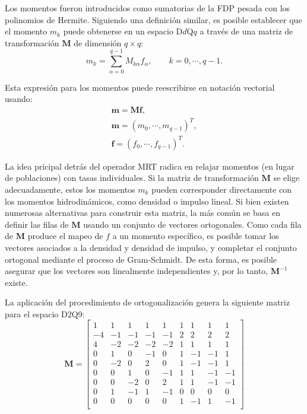 Los momentos fueron introducidos como sumatorias de la FDP pesada con los polinomios de Hermite. Siguiendo una definici\'on similar, es posible establecer que el momento $m_k$ puede obtenerse en un espacio D$d$Q$q$ a trav\'es de una matriz de transformaci\'on $\bm{M}$ de dimensi\'on $q \times q$:
\begin{equation}
	m_k = \sum_{\alpha=0}^{q-1}M_{k\alpha}f_{\alpha}, \qquad  k=0,\cdots, q-1.
\end{equation}

Esta expresi\'on para los momentos puede reescribirse en notaci\'on vectorial usando:
\begin{equation}
	\begin{gathered}
		\bm{m}=\bm{Mf}, \\
		\bm{m} = (m_0, \cdots, m_{q-1})^T, \\
		\bm{f} = (f_0, \cdots, f_{q-1})^T.
	\end{gathered}
\end{equation}

La idea pricipal detr\'as del operador MRT radica en relajar momentos (en lugar de poblaciones) con tasas individuales. Si la matriz de transformaci\'on $\bm{M}$ se elige adecuadamente, estos los momentos $m_k$ pueden corresponder directamente con los momentos hidrodin\'amicos, como densidad o impulso lineal. Si bien existen numerosas alternativas para construir esta matriz, la m\'as com\'un se basa en definir las filas de $\bm{M}$ usando un conjunto de vectores ortogonales. Como cada fila de $\bm{M}$ produce el mapeo de $f$ a un momento espec\'ifico, es posible tomar los vectores asociados a la densidad y densidad de impulso, y completar el conjunto ortogonal mediante el proceso de Gram-Schmidt. De esta forma, es posible asegurar que los vectores son linealmente independientes y, por lo tanto, $\bm{M}^{-1}$ existe.

La aplicaci\'on del procedimiento de ortogonalizaci\'on genera la siguiente matriz para el espacio D2Q9:
\begin{equation}
	\bm{M}=
	\begin{bmatrix}
	 1 &  1 &  1 &  1 &  1 & 1 &  1 &  1 &  1 \\
	-4 & -1 & -1 & -1 & -1 & 2 &  2 &  2 &  2 \\
	 4 & -2 & -2 & -2 & -2 & 1 &  1 &  1 &  1 \\
	 0 &  1 &  0 & -1 &  0 & 1 & -1 & -1 &  1 \\
	 0 & -2 &  0 &  2 &  0 & 1 & -1 & -1 &  1 \\
	 0 &  0 &  1 &  0 & -1 & 1 &  1 & -1 & -1 \\
	 0 &  0 & -2 &  0 &  2 & 1 &  1 & -1 & -1 \\
	 0 &  1 & -1 &  1 & -1 & 0 &  0 &  0 &  0 \\
	 0 &  0 &  0 &  0 &  0 & 1 & -1 &  1 & -1 \\
	\end{bmatrix}
	\label{eq:MTR_M_D2Q9}
\end{equation} 


